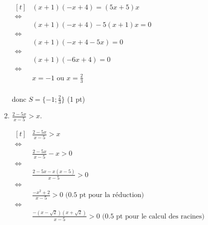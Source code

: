 \documentclass[a4paper,11pt]{article}
\theoremstyle{break}
\begin{document}
\begin{exo}
\begin{enumerate}
\begin{correction}

$\begin{aligned}[t]
           & (x+1)(-x+4)=(5x+5)x \\
      \iff \\
           & (x+1)(-x+4)-5(x+1)x=0\\
      \iff \\
           & (x+1)(-x+4-5x)=0\\
      \iff  \\
           &(x+1)(-6x+4)=0\\
      \iff  \\
          &x=-1 \textrm{ ou } x=\frac{2}{3} \\    
\end{aligned}$
    
donc $S=\{-1;\frac{2}{3}\}$ (1 pt)

%     
 
\end{correction}  
    
 
   \item $\frac{2-5 x}{x-5}>x$.

\begin{correction}

$\begin{aligned}[t]
           & \frac{2-5x}{x-5}>x\\
      \iff \\
           & \frac{2-5x}{x-5}-x>0\\
      \iff \\
           & \frac{2-5x-x(x-5)}{x-5}>0\\
      \iff \\
           &\frac{-x^2+2}{x-5}>0 \textrm{ (0.5 pt pour la r\'eduction) }\\     
      \iff \\
           &\frac{-(x-\sqrt{2})(x+\sqrt{2})}{x-5}>0 \textrm{ (0.5 pt pour le calcul des racines) }\\    
\end{aligned}$
 

\end{correction}
\end{enumerate}
\end{exo}
\end{document}
